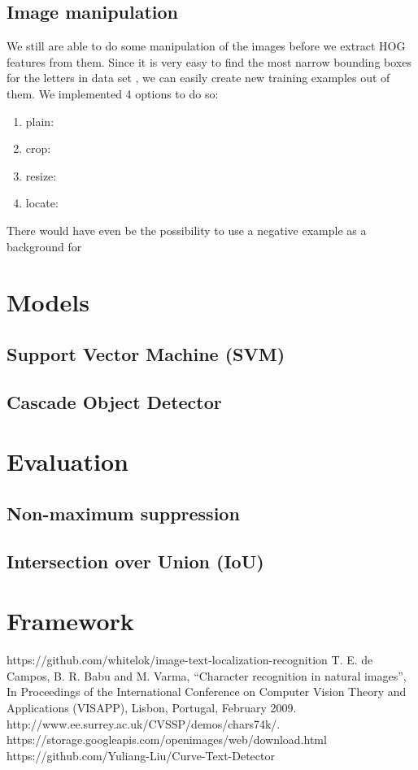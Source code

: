 \documentclass[conference]{IEEEtran}
\begin{document}
\subsection{Image manipulation}

We still are able to do some manipulation of the images before we extract HOG features from them. Since it is very easy to find the most narrow bounding boxes for the letters in data set \cite{bib:chars74k}, we can easily create new training examples out of them. We implemented 4 options to do so:
\begin{enumerate}
\item plain:
\item crop:
\item resize:
\item locate:
\end{enumerate}
There would have even be the possibility to use a negative example as a background for 

\section{Models}

\subsection{Support Vector Machine (SVM)}

\subsection{Cascade Object Detector}

\section{Evaluation}

\subsection{Non-maximum suppression}

\subsection{Intersection over Union (IoU)}

\section{Framework}

\begin{thebibliography}{00}
 https://github.com/whitelok/image-text-localization-recognition
 T. E. de Campos, B. R. Babu and M. Varma, ``Character recognition in natural images'', In Proceedings of the International Conference on Computer Vision Theory and Applications (VISAPP), Lisbon, Portugal, February 2009. http://www.ee.surrey.ac.uk/CVSSP/demos/chars74k/.
 https://storage.googleapis.com/openimages/web/download.html
 https://github.com/Yuliang-Liu/Curve-Text-Detector
\end{thebibliography}
\end{document}
